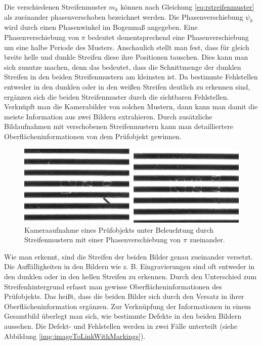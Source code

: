 {
	\begin{figure}[H]
		\centering
		
		\label{tikz:abbRechteckStreifenmuster}
	\end{figure}
}
%
\noindent
Die verschiedenen Streifenmuster $m_k$ können nach Gleichung \ref{eq:rstreifenmuster} als zueinander phasenverschoben bezeichnet werden.
Die Phasenverschiebung $\psi_k$ wird durch einen Phasenwinkel im Bogenmaß angegeben.
Eine Phasenverschiebung von $ \pi $ bedeutet dementsprechend eine Phasenverschiebung um eine halbe Periode des Musters.
Anschaulich stellt man fest, dass für gleich breite helle und dunkle Streifen diese ihre Positionen tauschen.
Dies kann man sich zunutze machen, denn das bedeutet, dass die Schnittmenge der dunklen Streifen in den beiden Streifenmustern am kleinsten ist.
Da bestimmte Fehlstellen entweder in den dunklen oder in den weißen Streifen deutlich zu erkennen sind, ergänzen sich die beiden Streifenmuster durch die sichtbaren Fehlstellen.
Verknüpft man die Kamerabilder von solchen Mustern, dann kann man damit die meiste Information aus zwei Bildern extrahieren.
Durch zusätzliche Bildaufnahmen mit verschobenen Streifenmustern kann man detailliertere Oberflächeninformationen von dem Prüfobjekt gewinnen.

\begin{figure}[H]
	\centering
	\includegraphics[width=\textwidth]{03_sichtpruefungDurchLichtstreuung/einsatzVonMehrerenStreifenmustern/figures/imageToLink}
	\caption[Zu verknüpfende Bilder]{Kameraaufnahme eines Prüfobjekts unter Beleuchtung durch Streifenmustern mit einer Phasenverschiebung von $ \pi $ zueinander.}
	\label{img:imageToLink}
\end{figure}

\noindent
Wie man erkennt, sind die Streifen der beiden Bilder genau zueinander versetzt.
Die Auffälligkeiten in den Bildern wie z. B. Eingravierungen sind oft entweder in den dunklen oder in den hellen Streifen zu erkennen.
Durch den Unterschied zum Streifenhintergrund erfasst man gewisse Oberflächeninformationen des Prüfobjekts.
Das heißt, dass die beiden Bilder sich durch den Versatz in ihrer Oberflächeninformation ergänzen.
Zur Verknüpfung der Informationen in einem Gesamtbild überlegt man sich, wie bestimmte Defekte in den beiden Bildern aussehen.
Die Defekt- und Fehlstellen werden in zwei Fälle unterteilt (siehe Abbildung \ref{img:imageToLinkWithMarkings}).

